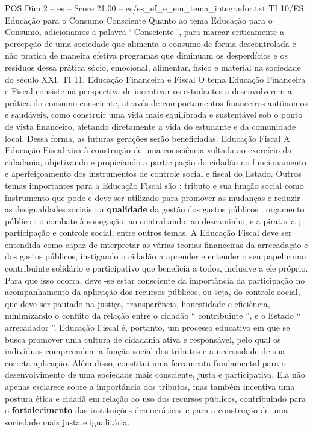 \begin{textsample}{POS Dim 2 – es – Score 21.00 – es/es\_ef\_e\_em\_tema\_integrador.txt}
TI 10/ES.
Educação para o Consumo Consciente Quanto ao tema Educação para o Consumo, adicionamos a palavra ‘ Consciente ’, para marcar criticamente a percepção de uma sociedade que alimenta o consumo de forma descontrolada e não pratica de maneira efetiva programas que diminuam os desperdícios e os resíduos dessa prática sócio, emocional, alimentar, físico e material na sociedade do século XXI.
TI 11.
Educação Financeira e Fiscal O tema Educação Financeira e Fiscal consiste na perspectiva de incentivar os estudantes a desenvolverem a prática do consumo consciente, através de comportamentos financeiros autônomos e saudáveis, como construir uma vida mais equilibrada e sustentável sob o ponto de vista financeiro, afetando diretamente a vida do estudante e da comunidade local.
Dessa forma, as futuras gerações serão beneficiadas.
Educação Fiscal A Educação Fiscal visa à construção de uma consciência voltada ao exercício da cidadania, objetivando e propiciando a participação do cidadão no funcionamento e aperfeiçoamento dos instrumentos de controle social e fiscal do Estado.
Outros temas importantes para a Educação Fiscal são : tributo e sua função social como instrumento que pode e deve ser utilizado para promover as mudanças e reduzir as desigualdades sociais ; a \textbf{qualidade} da gestão dos gastos públicos ; orçamento público ; o combate à sonegação, ao contrabando, ao descaminho, e a pirataria ; participação e controle social, entre outros temas.
A Educação Fiscal deve ser entendida como capaz de interpretar as várias teorias financeiras da arrecadação e dos gastos públicos, instigando o cidadão a aprender e entender o seu papel como contribuinte solidário e participativo que beneficia a todos, inclusive a ele próprio.
Para que isso ocorra, deve -se estar consciente da importância da participação no acompanhamento da aplicação dos recursos públicos, ou seja, do controle social, que deve ser pautado na justiça, transparência, honestidade e eficiência, minimizando o conflito da relação entre o cidadão “ contribuinte ”, e o Estado “ arrecadador ”.
Educação Fiscal é, portanto, um processo educativo em que se busca promover uma cultura de cidadania ativa e responsável, pelo qual os indivíduos compreendem a função social dos tributos e a necessidade de sua correta aplicação.
Além disso, constitui uma ferramenta fundamental para o desenvolvimento de uma sociedade mais consciente, justa e participativa.
Ela não apenas esclarece sobre a importância dos tributos, mas também incentiva uma postura ética e cidadã em relação ao uso dos recursos públicos, contribuindo para o \textbf{fortalecimento} das instituições democráticas e para a construção de uma sociedade mais justa e igualitária.

\end{textsample}
